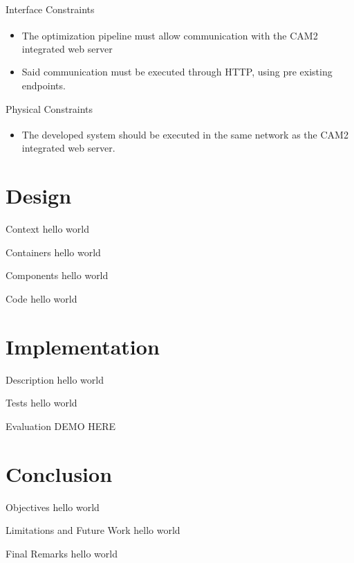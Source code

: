 \documentclass[10pt]{beamer}
\begin{document}
  \begin{frame}{Interface Constraints}
    \begin{itemize}
      \item The optimization pipeline must allow communication with the CAM2\textsuperscript{\textregistered} integrated web server
      \item Said communication must be executed through HTTP, using pre existing endpoints.
    \end{itemize}
  \end{frame}
  \begin{frame}{Physical Constraints}
    \begin{itemize}
      \item The developed system should be executed in the same network as the CAM2\textsuperscript{\textregistered} integrated web server.
    \end{itemize}
  \end{frame}

  \section{Design}
  \begin{frame}{Context}
    hello world
  \end{frame}
  \begin{frame}{Containers}
    hello world
  \end{frame}
  \begin{frame}{Components}
    hello world
  \end{frame}
  \begin{frame}{Code}
    hello world
  \end{frame}

  \section{Implementation}
  \begin{frame}{Description}
    hello world
  \end{frame}
  \begin{frame}{Tests}
    hello world
  \end{frame}
  \begin{frame}{Evaluation}
    DEMO HERE
  \end{frame}

  \section{Conclusion}
  \begin{frame}{Objectives}
    hello world
  \end{frame}
  \begin{frame}{Limitations and Future Work}
    hello world
  \end{frame}
  \begin{frame}{Final Remarks}
    hello world
  \end{frame}
\end{document}
